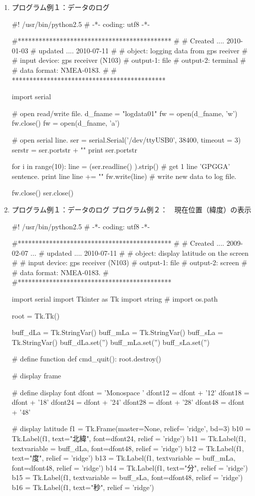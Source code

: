\documentclass[mingoth,a4paper]{jsarticle}
\begin{document}
\begin{enumerate}
\begin{figure}[h!]
\end{figure}
\clearpage
\item プログラム例１：データのログ
\begin{commandline}
#!	/usr/bin/python2.5
# -*- coding: utf8 -*-

#********************************************
#	
#	Created			.... 2010-01-03
#	updated			.... 2010-07-11
#	
#	object:			logging data from gps  reeiver	
#	
#	input device:	gps receiver (N103)
#	output-1:		file
#	output-2:		terminal
#	
#	data format:	NMEA-0183.
#	
# ********************************************

import	serial

# open read/write file.
d_fname = "logdata01"
fw = open(d_fname, 'w')
fw.close()
fw = open(d_fname, 'a')

# open serial line.
ser = serial.Serial('/dev/ttyUSB0', 38400, timeout = 3)
serstr = ser.portstr + "\n"
print ser.portstr

for  i in range(10):
	line = (ser.readline() ).strip() 	# get 1 line 'GPGGA' sentence.
	print line
	line += "\n"
	fw.write(line)						# write new data to log file.

fw.close()
ser.close()
\end{commandline}
\item プログラム例１：データのログ
プログラム例２：　現在位置（緯度）の表示
\begin{commandline}
#!	/usr/bin/python2.5
# -*- coding: utf8 -*-

#********************************************
#	
#	Created			.... 2009-02-07 ...
#	updated			.... 2010-07-11
#	
#	object:			display latitude on the screen	
#	
#	input device:	gps receiver (N103)
#	output-1:		file
#	output-2:		screen
#	
#	data format:	NMEA-0183.
#	
#********************************************

import	serial
import Tkinter as Tk
import	string
# import os.path


root = Tk.Tk()

buff_dLa = Tk.StringVar()
buff_mLa = Tk.StringVar()
buff_sLa = Tk.StringVar()
buff_dLa.set('')
buff_mLa.set('')
buff_sLa.set('')

# define function
def cmd_quit():
	root.destroy()

# display frame

# define display font
dfont = 'Monospace '
dfont12 = dfont + '12'
dfont18 = dfont + '18'
dfont24 = dfont + '24'
dfont28 = dfont + '28'
dfont48 = dfont + '48'

# display latitude
f1 = Tk.Frame(master=None, relief= 'ridge', bd=3)
b10 = Tk.Label(f1, text="北緯", font=dfont24, relief = 'ridge')
b11 = Tk.Label(f1, textvariable = buff_dLa, font=dfont48, relief = 'ridge')
b12 = Tk.Label(f1, text="度", relief = 'ridge')
b13 = Tk.Label(f1, textvariable = buff_mLa, font=dfont48, relief = 'ridge')
b14 = Tk.Label(f1, text="分", relief = 'ridge')
b15 = Tk.Label(f1, textvariable = buff_sLa, font=dfont48, relief = 'ridge')
b16 = Tk.Label(f1, text="秒", relief = 'ridge')


\end{commandline}
\end{enumerate}
\end{document}
